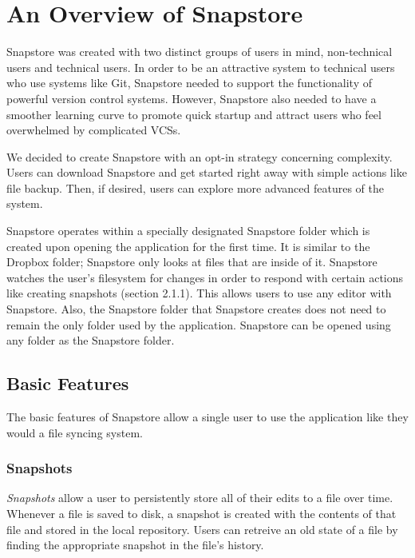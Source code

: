 \chapter{An Overview of Snapstore}

Snapstore was created with two distinct groups of users in mind, non-technical users and technical users. In order to be an attractive system to technical users who use systems like Git, Snapstore needed to support the functionality of powerful version control systems. However, Snapstore also needed to have a smoother learning curve to promote quick startup and attract users who feel overwhelmed by complicated VCSs. 

We decided to create Snapstore with an opt-in strategy concerning complexity. Users can download Snapstore and get started right away with simple actions like file backup. Then, if desired, users can explore more advanced features of the system.


Snapstore operates within a specially designated Snapstore folder which is created upon opening the application for the first time. It is similar to the Dropbox folder; Snapstore only looks at files that are inside of it. Snapstore watches the user's filesystem for changes in order to respond with certain actions like creating snapshots (section 2.1.1). This allows users to use any editor with Snapstore. Also, the Snapstore folder that Snapstore creates does not need to remain the only folder used by the application. Snapstore can be opened using any folder as the Snapstore folder.

\section{Basic Features}

The basic features of Snapstore allow a single user to use the application like they would a file syncing system.

\subsection{Snapshots}

\textit{Snapshots} allow a user to persistently store all of their edits to a file over time. Whenever a file is saved to disk, a snapshot is created with the contents of that file and stored in the local repository. Users can retreive an old state of a file by finding the appropriate snapshot in the file's history.

